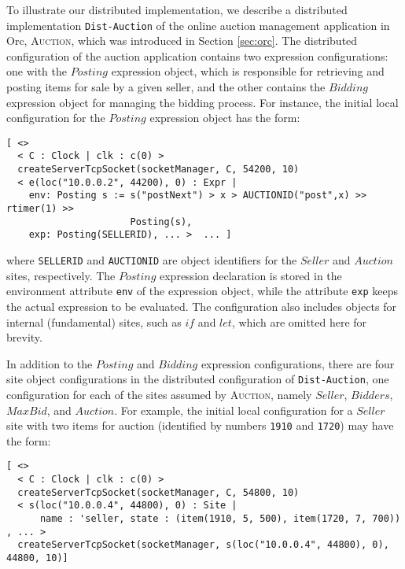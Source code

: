 \documentclass{eptcs}
\begin{document}
To illustrate our distributed implementation, we describe a distributed implementation \texttt{Dist-Auction} of the online auction management application in Orc, \textsc{Auction}, which was introduced in Section \ref{sec:orc}. The distributed configuration of the auction application contains two expression configurations: one with the $\mathit{Posting}$ expression object, which is responsible for retrieving and posting items for sale by a given seller, and the other contains the $\mathit{Bidding}$ expression object for managing the bidding process. For instance, the initial local configuration for the $\mathit{Posting}$ expression object has the form:

\begin{small}
\begin{verbatim}
[ <> 
  < C : Clock | clk : c(0) > 
  createServerTcpSocket(socketManager, C, 54200, 10)
  < e(loc("10.0.0.2", 44200), 0) : Expr | 
    env: Posting s := s("postNext") > x > AUCTIONID("post",x) >> rtimer(1) >> 
                      Posting(s), 
    exp: Posting(SELLERID), ... >  ... ]
\end{verbatim}
\end{small}

\noindent where \texttt{SELLERID} and \texttt{AUCTIONID} are object identifiers for the $\mathit{Seller}$ and $\mathit{Auction}$ sites, respectively. The $\mathit{Posting}$ expression declaration is stored in the environment attribute \texttt{env} of the expression object, while the attribute \texttt{exp} keeps the actual expression to be evaluated. The configuration also includes objects for internal (fundamental) sites, such as $\mathit{if}$ and $\mathit{let}$, which are omitted here for brevity.

In addition to the $\mathit{Posting}$ and $\mathit{Bidding}$ expression configurations, there are four site object configurations in the distributed configuration of \texttt{Dist-Auction}, one configuration for each of the sites assumed by \textsc{Auction}, namely $\mathit{Seller}$, $\mathit{Bidders}$, $\mathit{MaxBid}$, and $\mathit{Auction}$. For example, the initial local configuration for a  $\mathit{Seller}$ site with two items for auction (identified by numbers \texttt{1910} and \texttt{1720}) may have the form:

\begin{small}
\begin{verbatim}
[ <> 
  < C : Clock | clk : c(0) > 
  createServerTcpSocket(socketManager, C, 54800, 10)
  < s(loc("10.0.0.4", 44800), 0) : Site | 
      name : 'seller, state : (item(1910, 5, 500), item(1720, 7, 700)) , ... >
  createServerTcpSocket(socketManager, s(loc("10.0.0.4", 44800), 0), 44800, 10)]
\end{verbatim}
\end{small}
\end{document}

